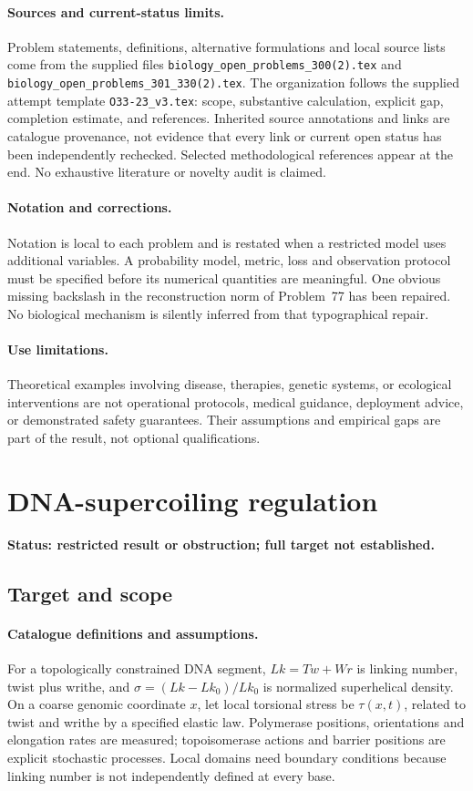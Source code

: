\documentclass[11pt]{article}
\begin{document}
\paragraph{Sources and current-status limits.}
Problem statements, definitions, alternative formulations and local source lists
come from the supplied files
\texttt{biology\_open\_problems\_300(2).tex} and
\texttt{biology\_open\_problems\_301\_330(2).tex}.
The organization follows the supplied attempt template
\texttt{O33-23\_v3.tex}: scope, substantive calculation, explicit gap,
completion estimate, and references. Inherited source annotations and links are
catalogue provenance, not evidence that every link or current open status has
been independently rechecked. Selected methodological references appear at the
end. No exhaustive literature or novelty audit is claimed.

\paragraph{Notation and corrections.}
Notation is local to each problem and is restated when a restricted model uses
additional variables. A probability model, metric, loss and observation protocol
must be specified before its numerical quantities are meaningful. One obvious
missing backslash in the reconstruction norm of Problem~77 has been repaired.
No biological mechanism is silently inferred from that typographical repair.

\paragraph{Use limitations.}
Theoretical examples involving disease, therapies, genetic systems, or ecological
interventions are not operational protocols, medical guidance, deployment advice,
or demonstrated safety guarantees. Their assumptions and empirical gaps are part
of the result, not optional qualifications.


\section*{DNA-supercoiling regulation}
\label{prob:095}
\noindent\textbf{Status: restricted result or obstruction; full target not established.}
\subsection{Target and scope}
\paragraph{Catalogue definitions and assumptions.}
For a topologically constrained DNA segment, $Lk=Tw+Wr$ is linking number, twist plus writhe, and $\sigma=(Lk-Lk_0)/Lk_0$ is normalized superhelical density. On a coarse genomic coordinate $x$, let local torsional stress be $\tau(x,t)$, related to twist and writhe by a specified elastic law. Polymerase positions, orientations and elongation rates are measured; topoisomerase actions and barrier positions are explicit stochastic processes. Local domains need boundary conditions because linking number is not independently defined at every base.
\end{document}
